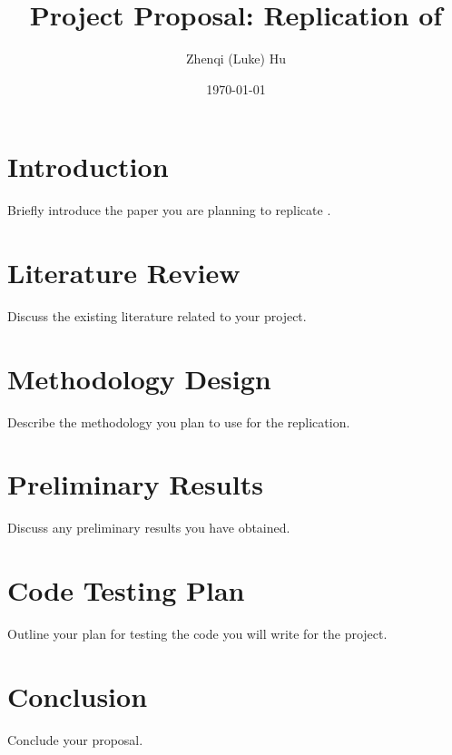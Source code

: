 \documentclass[12pt]{article}
\title{Project Proposal: Replication of \citet{childersDifferentiableStateSpaceModels2022}}
\author{Zhenqi (Luke) Hu}
\date{\today}
\begin{document}
\maketitle

\section{Introduction}
Briefly introduce the paper you are planning to replicate \citet{childersDifferentiableStateSpaceModels2022}.

\section{Literature Review}
Discuss the existing literature related to your project.

\section{Methodology Design}
Describe the methodology you plan to use for the replication.

\section{Preliminary Results}
Discuss any preliminary results you have obtained.

\section{Code Testing Plan}
Outline your plan for testing the code you will write for the project.

\section{Conclusion}
Conclude your proposal.


\end{document}
